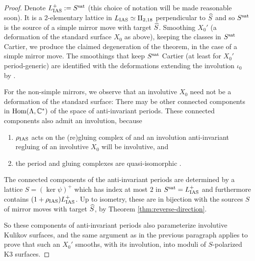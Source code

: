 \documentclass{amsart}
\begin{document}
\begin{proof}
Denote $L_{\rm IAS}^+:=S^{\rm sat}$ (this choice of notation will be made reasonable soon).
It is a $2$-elementary lattice in $L_{\rm IAS} \simeq {\rm II}_{2,18}$ perpendicular to ${\widehat S}$
and so $S^{\rm sat}$ is the source of a simple mirror move with
target ${\widehat S}$. Smoothing $X_0'$ (a deformation
of the standard surface $X_0$ as above), keeping the classes in $S^{\rm sat}$ Cartier,
we produce the claimed degeneration of the theorem, in the case of a simple mirror move.
The smoothings that keep $S^{\rm sat}$ Cartier (at least for $X_0'$ period-generic) are identified with
the deformations extending the involution $\iota_0$ by \cite[Thm.~6.35]{alexeev2019stable-pair}.


For the non-simple mirrors, we observe that an involutive $X_0$ need not
be a deformation of the standard surface: There may be other connected
components in ${\rm Hom}(\Lambda,{\mathbb C}^*)$ of the space of anti-invariant periods.
These connected components also admit an involution, because
\begin{enumerate} 
\item $\rho_{\rm IAS}$
acts on the (re)gluing complex of \cite[Sec.~7A]{alexeev2021compact} and an involution
anti-invariant regluing of an involutive $X_0$ will be involutive, and 
\item the period
and gluing complexes are quasi-isomorphic \cite[Thm.~7.9]{alexeev2021compact}.
\end{enumerate}

The connected components of the anti-invariant periods are determined by a lattice
$S=({\ker \psi})^+$ which has index at most $2$ in $S^{\rm sat}=L_{\rm IAS}^+$ and furthermore contains
$(1+\rho_{\rm IAS})L_{\rm IAS}^+$. Up to isometry, these are in bijection
with the sources $S$ of mirror moves with target ${\widehat S}$, by
Theorem \ref{thm:reverse-direction}. 

So these components of anti-invariant periods also parameterize involutive
Kulikov surfaces, and the same argument as in the previous paragraph applies
to prove that such an $X_0'$ smooths, with its involution, into moduli of $S$-polarized K3 surfaces.


\end{proof}
\end{document}
